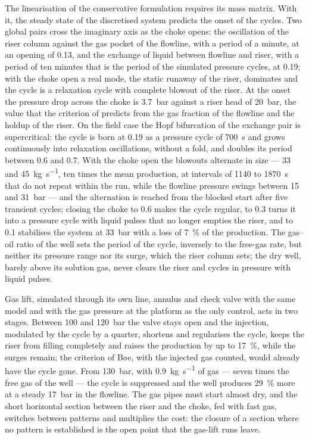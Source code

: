 \documentclass[a4paper,fleqn]{cas-sc}
\begin{document}
The linearisation of the conservative formulation requires its mass matrix. With it, the steady state of the discretised system predicts the onset of the cycles. Two global pairs cross the imaginary axis as the choke opens: the oscillation of the riser column against the gas pocket of the flowline, with a period of a minute, at an opening of 0.13, and the exchange of liquid between flowline and riser, with a period of ten minutes that is the period of the simulated pressure cycles, at 0.19; with the choke open a real mode, the static runaway of the riser, dominates and the cycle is a relaxation cycle with complete blowout of the riser. At the onset the pressure drop across the choke is \SI{3.7}{\bar} against a riser head of \SI{20}{\bar}, the value that the criterion of \citet{jansen1996} predicts from the gas fraction of the flowline and the holdup of the riser. On the field case the Hopf bifurcation of the exchange pair is supercritical: the cycle is born at 0.19 as a pressure cycle of \SI{700}{\second} and grows continuously into relaxation oscillations, without a fold, and doubles its period between 0.6 and 0.7. With the choke open the blowouts alternate in size --- 33 and \SI{45}{\kilogram\per\second}, ten times the mean production, at intervals of 1140 to \SI{1870}{\second} that do not repeat within the run, while the flowline pressure swings between 15 and \SI{31}{\bar} --- and the alternation is reached from the blocked start after five transient cycles; closing the choke to 0.6 makes the cycle regular, to 0.3 turns it into a pressure cycle with liquid pulses that no longer empties the riser, and to 0.1 stabilises the system at \SI{33}{\bar} with a loss of \SI{7}{\percent} of the production. The gas--oil ratio of the well sets the period of the cycle, inversely to the free-gas rate, but neither its pressure range nor its surge, which the riser column sets; the dry well, barely above its solution gas, never clears the riser and cycles in pressure with liquid pulses.

Gas lift, simulated through its own line, annulus and check valve with the same model and with the gas pressure at the platform as the only control, acts in two stages. Between 100 and \SI{120}{\bar} the valve stays open and the injection, modulated by the cycle by a quarter, shortens and regularises the cycle, keeps the riser from filling completely and raises the production by up to \SI{17}{\percent}, while the surges remain; the criterion of B{\o}e, with the injected gas counted, would already have the cycle gone. From \SI{130}{\bar}, with \SI{0.9}{\kilogram\per\second} of gas --- seven times the free gas of the well --- the cycle is suppressed and the well produces \SI{29}{\percent} more at a steady \SI{17}{\bar} in the flowline. The gas pipes must start almost dry, and the short horizontal section between the riser and the choke, fed with fast gas, switches between patterns and multiplies the cost: the closure of a section where no pattern is established is the open point that the gas-lift runs leave.
\end{document}
